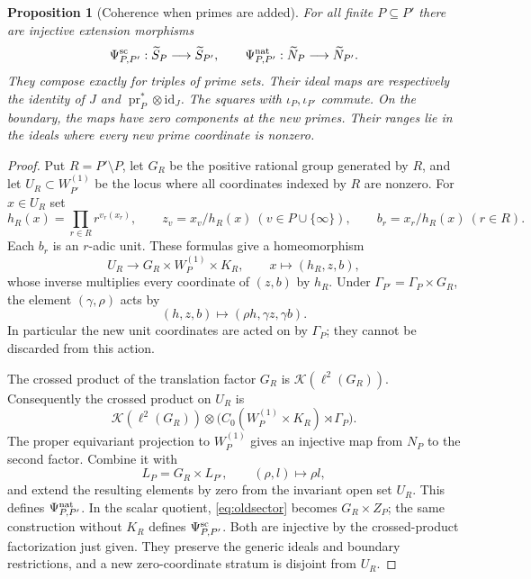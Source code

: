 \documentclass[11pt]{article}
\newcommand{\K}{\mathcal K}
\newtheorem{proposition}[theorem]{Proposition}
\theoremstyle{definition}
\theoremstyle{remark}
\begin{document}
\begin{proposition}[Coherence when primes are added]\label{prop:coherence}
For all finite $P\subseteq P'$ there are injective extension morphisms
\[
 \Psi^{\rm sc}_{P,P'}:\widetilde S_P\longrightarrow\widetilde S_{P'},
 \qquad
 \Psi^{\rm nat}_{P,P'}:\widetilde N_P\longrightarrow\widetilde N_{P'}.
\]
They compose exactly for triples of prime sets. Their ideal maps are respectively the identity of $J$ and $\operatorname{pr}_P^*\otimes\mathrm{id}_J$. The squares with $\iota_P,\iota_{P'}$ commute. On the boundary, the maps have zero components at the new primes. Their ranges lie in the ideals where every new prime coordinate is nonzero.
\end{proposition}
\begin{proof}
Put $R=P'\setminus P$, let $G_R$ be the positive rational group generated by $R$, and let $U_R\subset W_{P'}^{(1)}$ be the locus where all coordinates indexed by $R$ are nonzero. For $x\in U_R$ set
\[
 h_R(x)=\prod_{r\in R}r^{v_r(x_r)},\qquad
 z_v=x_v/h_R(x)\ (v\in P\cup\{\infty\}),\qquad
 b_r=x_r/h_R(x)\ (r\in R).
\]
Each $b_r$ is an $r$-adic unit. These formulas give a homeomorphism
\begin{equation}\label{eq:oldsector}
 U_R\longrightarrow G_R\times W_P^{(1)}\times K_R,
 \qquad x\longmapsto(h_R,z,b),
\end{equation}
whose inverse multiplies every coordinate of $(z,b)$ by $h_R$. Under $\Gamma_{P'}=\Gamma_P\times G_R$, the element $(\gamma,\rho)$ acts by
\[
 (h,z,b)\longmapsto(\rho h,\gamma z,\gamma b).
\]
In particular the new unit coordinates are acted on by $\Gamma_P$; they cannot be discarded from this action.

The crossed product of the translation factor $G_R$ is $\K(\ell^2(G_R))$. Consequently the crossed product on $U_R$ is
\[
 \K(\ell^2(G_R))\otimes
 \bigl(C_0(W_P^{(1)}\times K_R)\rtimes\Gamma_P\bigr).
\]
The proper equivariant projection to $W_P^{(1)}$ gives an injective map from $N_P$ to the second factor. Combine it with
\[
 L_P=G_R\times L_{P'},
 \qquad(\rho,l)\longmapsto\rho l,
\]
and extend the resulting elements by zero from the invariant open set $U_R$. This defines $\Psi^{\rm nat}_{P,P'}$. In the scalar quotient, \eqref{eq:oldsector} becomes $G_R\times Z_P$; the same construction without $K_R$ defines $\Psi^{\rm sc}_{P,P'}$. Both are injective by the crossed-product factorization just given. They preserve the generic ideals and boundary restrictions, and a new zero-coordinate stratum is disjoint from $U_R$.


\end{proof}
\end{document}
